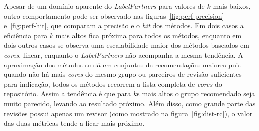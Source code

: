 \documentclass[12pt,openany,oneside,a4paper,english,brazil]{abntbibufjf}
\begin{document}
Apesar de um domínio aparente do \textit{LabelPartners} para valores de $k$ mais baixos, outro comportamento pode ser observado nas figuras~\ref{fig:perf-precision} e~\ref{fig:perf-hit}, que comparam a precisão e o \textit{hit} dos métodos. Em dois casos a eficiência para $k$ mais altos fica próxima para todos os métodos, enquanto em dois outros casos se observa uma escalabilidade maior dos métodos baseados em \textit{cores}, linear, enquanto o \textit{LabelPartners} não acompanha a mesma tendência. A aproximação dos métodos se dá em conjuntos de recomendações maiores pois quando não há mais \textit{cores} do mesmo grupo ou parceiros de revisão suficientes para indicação, todos os métodos recorrem a lista completa de \textit{cores} do repositório. Assim a tendência é que para $k$s mais altos o grupo recomendado seja muito parecido, levando ao resultado próximo. Além disso, como  grande parte das revisões possui apenas um revisor (como mostrado na figura~\ref{fig:dist-rc}), o valor das duas métricas tende a ficar mais próximo.
\end{document}
